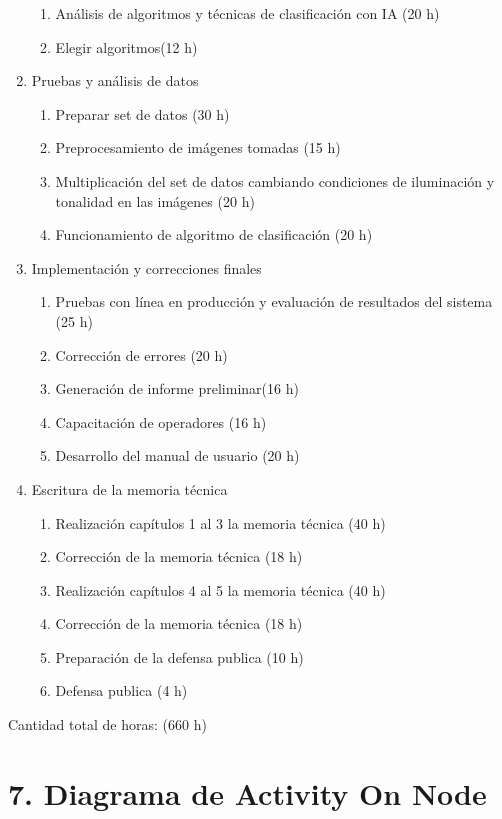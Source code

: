 \documentclass[11pt]{charter}
\begin{document}
\begin{enumerate}
\begin{enumerate}
	\item Análisis de algoritmos y técnicas de clasificación con IA (20 h)
	\item Elegir algoritmos(12 h)
	\end{enumerate}
\item Pruebas y análisis de datos
	\begin{enumerate}
	\item Preparar set de datos (30 h)
	\item Preprocesamiento de imágenes tomadas (15 h)
	\item Multiplicación del set de datos cambiando condiciones de iluminación y tonalidad en las imágenes (20 h)
	\item Funcionamiento de algoritmo de clasificación (20 h)
	\end{enumerate}
\item Implementación y correcciones finales
	\begin{enumerate}
	\item Pruebas con línea en producción y evaluación de resultados del sistema (25 h)
	\item Corrección de errores (20 h)
	\item Generación de informe preliminar(16 h)
	\item Capacitación de operadores (16 h)
	\item Desarrollo del manual de usuario (20 h)
	\end{enumerate}
\item Escritura de la memoria técnica
	\begin{enumerate}
	\item Realización capítulos 1 al 3 la memoria técnica (40 h) 
	\item Corrección de la memoria técnica (18 h)
	\item Realización capítulos 4 al 5 la memoria técnica (40 h)
	\item Corrección de la memoria técnica (18 h)
	\item Preparación de la defensa publica (10 h)
	\item Defensa publica (4 h)
	
	\end{enumerate}

\end{enumerate}

Cantidad total de horas: (660 h)



\section{7. Diagrama de Activity On Node}
\label{sec:AoN}
\end{document}

